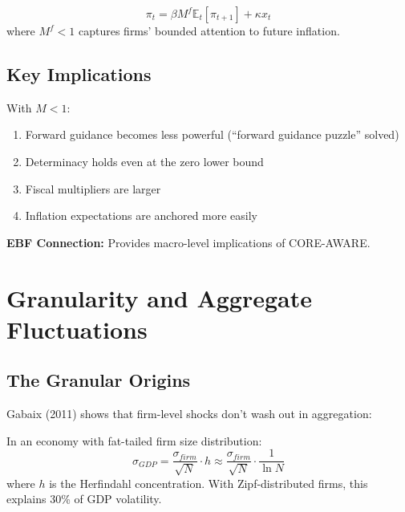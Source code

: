 \begin{definition}
\begin{equation}
\pi_t = \beta M^f \mathbb{E}_t[\pi_{t+1}] + \kappa x_t
\end{equation}
where $M^f < 1$ captures firms' bounded attention to future inflation.
\end{definition}

\subsection{Key Implications}

\begin{axiom}
\label{ax:xg5}
With $M < 1$:
\begin{enumerate}
    \item Forward guidance becomes less powerful (``forward guidance puzzle'' solved)
    \item Determinacy holds even at the zero lower bound
    \item Fiscal multipliers are larger
    \item Inflation expectations are anchored more easily
\end{enumerate}
\textbf{EBF Connection:} Provides macro-level implications of CORE-AWARE.
\end{axiom}

\section{Granularity and Aggregate Fluctuations}

\subsection{The Granular Origins}

Gabaix (2011) shows that firm-level shocks don't wash out in aggregation:

\begin{theorem}
In an economy with fat-tailed firm size distribution:
\begin{equation}
\sigma_{GDP} = \frac{\sigma_{firm}}{\sqrt{N}} \cdot h \approx \frac{\sigma_{firm}}{\sqrt{N}} \cdot \frac{1}{\ln N}
\end{equation}
where $h$ is the Herfindahl concentration. With Zipf-distributed firms, this explains 30\% of GDP volatility.
\end{theorem}

